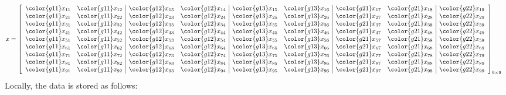 \begin{align*}
x &= \left[
      \begin{array}{ll|ll|ll|ll|l}
      \color{g11}x_{11} & \color{g11}x_{12} & \color{g12}x_{13} & \color{g12}x_{14} & \color{g13}x_{15} & \color{g13}x_{16} & \color{g21}x_{17} & \color{g21}x_{18} & \color{g22}x_{19}\\
      \color{g11}x_{21} & \color{g11}x_{22} & \color{g12}x_{23} & \color{g12}x_{24} & \color{g13}x_{25} & \color{g13}x_{26} & \color{g21}x_{27} & \color{g21}x_{28} & \color{g22}x_{29}\\
      \color{g11}x_{31} & \color{g11}x_{32} & \color{g12}x_{33} & \color{g12}x_{34} & \color{g13}x_{35} & \color{g13}x_{36} & \color{g21}x_{37} & \color{g21}x_{38} & \color{g22}x_{39}\\
      \color{g11}x_{41} & \color{g11}x_{42} & \color{g12}x_{43} & \color{g12}x_{44} & \color{g13}x_{45} & \color{g13}x_{46} & \color{g21}x_{47} & \color{g21}x_{48} & \color{g22}x_{49}\\
      \color{g11}x_{51} & \color{g11}x_{52} & \color{g12}x_{53} & \color{g12}x_{54} & \color{g13}x_{55} & \color{g13}x_{56} & \color{g21}x_{57} & \color{g21}x_{58} & \color{g22}x_{59}\\
      \color{g11}x_{61} & \color{g11}x_{62} & \color{g12}x_{63} & \color{g12}x_{64} & \color{g13}x_{65} & \color{g13}x_{66} & \color{g21}x_{67} & \color{g21}x_{68} & \color{g22}x_{69}\\
      \color{g11}x_{71} & \color{g11}x_{72} & \color{g12}x_{73} & \color{g12}x_{74} & \color{g13}x_{75} & \color{g13}x_{76} & \color{g21}x_{77} & \color{g21}x_{78} & \color{g22}x_{79}\\
      \color{g11}x_{81} & \color{g11}x_{82} & \color{g12}x_{83} & \color{g12}x_{84} & \color{g13}x_{85} & \color{g13}x_{86} & \color{g21}x_{87} & \color{g21}x_{88} & \color{g22}x_{89}\\
      \color{g11}x_{91} & \color{g11}x_{92} & \color{g12}x_{93} & \color{g12}x_{94} & \color{g13}x_{95} & \color{g13}x_{96} & \color{g21}x_{97} & \color{g21}x_{98} & \color{g22}x_{99}\\
      \end{array}
\right]_{9\times 9}
\end{align*}
Locally, the data is stored as follows:

